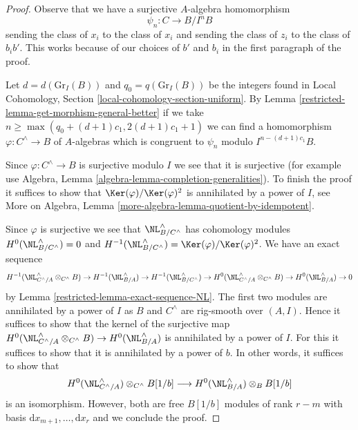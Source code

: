 \begin{proof}
\medskip\noindent
Observe that we have a surjective $A$-algebra homomorphism
$$
\psi_n : C \longrightarrow B/I^nB
$$
sending the class of $x_i$ to the class of $x_i$ and sending the class of
$z_i$ to the class of $b_ib'$. This works because of our choices of $b'$
and $b_i$ in the first paragraph of the proof.

\medskip\noindent
Let $d = d(\text{Gr}_I(B))$ and $q_0 = q(\text{Gr}_I(B))$ be the integers
found in
Local Cohomology, Section \ref{local-cohomology-section-uniform}.
By Lemma \ref{restricted-lemma-get-morphism-general-better} if we take
$n \geq \max(q_0 + (d + 1)c_1, 2(d + 1)c_1 + 1)$ we can find a homomorphism
$\varphi : C^\wedge \to B$ of $A$-algebras which is congruent to
$\psi_n$ modulo $I^{n - (d + 1)c_1}B$.

\medskip\noindent
Since $\varphi : C^\wedge \to B$ is surjective modulo $I$
we see that it is surjective (for example use
Algebra, Lemma \ref{algebra-lemma-completion-generalities}).
To finish the proof it suffices to show that
$\Ker(\varphi)/\Ker(\varphi)^2$ is annihilated by a power of $I$, see
More on Algebra, Lemma \ref{more-algebra-lemma-quotient-by-idempotent}.

\medskip\noindent
Since $\varphi$ is surjective we see that
$\NL_{B/C^{\wedge}}^\wedge$ has cohomology modules
$H^0(\NL_{B/C^{\wedge}}^\wedge) = 0$ and
$H^{-1}(\NL_{B/C^{\wedge}}^\wedge) = \Ker(\varphi)/\Ker(\varphi)^2$.
We have an exact sequence
$$
H^{-1}(\NL_{C^\wedge/A}^\wedge \otimes_{C^\wedge} B) \to
H^{-1}(\NL_{B/A}^\wedge) \to
H^{-1}(\NL_{B/C^{\wedge}}^\wedge) \to
H^0(\NL_{C^\wedge/A}^\wedge \otimes_{C^\wedge} B) \to
H^0(\NL_{B/A}^\wedge) \to 0
$$
by Lemma \ref{restricted-lemma-exact-sequence-NL}. The first two modules are
annihilated by a power of $I$ as $B$ and $C^\wedge$ are rig-smooth over
$(A, I)$. Hence it suffices
to show that the kernel of the surjective map
$H^0(\NL_{C^\wedge/A}^\wedge \otimes_{C^\wedge} B) \to
H^0(\NL_{B/A}^\wedge)$ is annihilated by a power of $I$.
For this it suffices to show that it is annihilated by
a power of $b$. In other words, it suffices to show that
$$
H^0(\NL_{C^\wedge/A}^\wedge) \otimes_{C^\wedge} B[1/b]
\longrightarrow
H^0(\NL_{B/A}^\wedge) \otimes_B B[1/b]
$$
is an isomorphism. However, both are free $B[1/b]$ modules
of rank $r - m$ with basis $\text{d}x_{m + 1}, \ldots, \text{d}x_r$
and we conclude the proof.
\end{proof}

